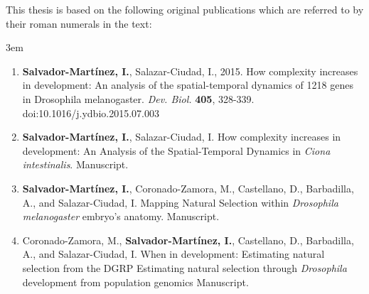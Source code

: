 
\vspace{1cm}

This thesis is based on the following original publications which are referred to by their roman numerals in the text:

\vspace{0.5cm}

%
\renewcommand*{\thefootnote}{\fnsymbol{footnote}}

\begin{flushleft}
\leftskip3em
\rightskip\leftskip
\normalsize{

\begin{enumerate}[label=\Roman*]
  \item  \textbf{Salvador-Mart\'{i}nez, I.}, Salazar-Ciudad, I., 2015. 
  How complexity increases in development: An analysis of the spatial-temporal dynamics of 1218 genes in Drosophila melanogaster.
   \textit{Dev. Biol.} \textbf{405}, 328-339. doi:10.1016/j.ydbio.2015.07.003
  \vspace{0.5cm}
    
  \item  \textbf{Salvador-Mart\'{i}nez, I.}, Salazar-Ciudad, I. 
  How complexity increases in development: An Analysis of the Spatial-Temporal Dynamics in \textit{Ciona intestinalis}. Manuscript.
  \vspace{0.5cm}

  \item \textbf{Salvador-Mart\'{i}nez, I.\footnotemark[1]}, Coronado-Zamora, M.\footnotemark[1], Castellano, D.\footnotemark[1], Barbadilla, A., and Salazar-Ciudad, I. 
  Mapping Natural Selection within \textit{Drosophila melanogaster} embryo's anatomy.
   Manuscript.
  \vspace{0.5cm}
  
  \item  Coronado-Zamora, M.\footnotemark[1], \textbf{Salvador-Mart\'{i}nez, I.\footnotemark[1]}, Castellano, D., Barbadilla, A., and Salazar-Ciudad, I. 
  When in development: Estimating natural selection from the DGRP Estimating natural selection through \textit{Drosophila} development from population genomics
Manuscript.
  
\end{enumerate}
%
\renewcommand*{\thefootnote}{\arabic{footnote}}
%
}
\end{flushleft}

